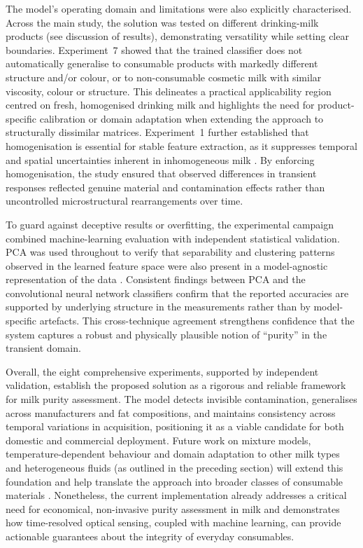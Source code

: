 \documentclass[12pt,a4paper,oneside]{report}
\begin{document}
The model's operating domain and limitations were also explicitly characterised. Across the main study, the solution was tested on different drinking-milk products (see discussion of results), demonstrating versatility while setting clear boundaries. Experiment~7 showed that the trained classifier does not automatically generalise to consumable products with markedly different structure and/or colour, or to non-consumable cosmetic milk with similar viscosity, colour or structure. This delineates a practical applicability region centred on fresh, homogenised drinking milk and highlights the need for product-specific calibration or domain adaptation when extending the approach to structurally dissimilar matrices. Experiment~1 further established that homogenisation is essential for stable feature extraction, as it suppresses temporal and spatial uncertainties inherent in inhomogeneous milk \cite{walstra1999,michalski2007}. By enforcing homogenisation, the study ensured that observed differences in transient responses reflected genuine material and contamination effects rather than uncontrolled microstructural rearrangements over time.

To guard against deceptive results or overfitting, the experimental campaign combined machine-learning evaluation with independent statistical validation. PCA was used throughout to verify that separability and clustering patterns observed in the learned feature space were also present in a model-agnostic representation of the data \cite{wold1987}. Consistent findings between PCA and the convolutional neural network classifiers confirm that the reported accuracies are supported by underlying structure in the measurements rather than by model-specific artefacts. This cross-technique agreement strengthens confidence that the system captures a robust and physically plausible notion of ``purity'' in the transient domain.

Overall, the eight comprehensive experiments, supported by independent validation, establish the proposed solution as a rigorous and reliable framework for milk purity assessment. The model detects invisible contamination, generalises across manufacturers and fat compositions, and maintains consistency across temporal variations in acquisition, positioning it as a viable candidate for both domestic and commercial deployment. Future work on mixture models, temperature-dependent behaviour and domain adaptation to other milk types and heterogeneous fluids (as outlined in the preceding section) will extend this foundation and help translate the approach into broader classes of consumable materials \cite{burgwald1947,lott2023}. Nonetheless, the current implementation already addresses a critical need for economical, non-invasive purity assessment in milk and demonstrates how time-resolved optical sensing, coupled with machine learning, can provide actionable guarantees about the integrity of everyday consumables.
\end{document}
